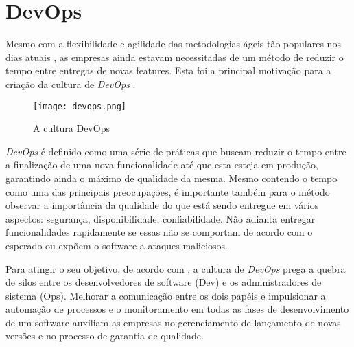 

\section{DevOps}

Mesmo com a flexibilidade e agilidade das metodologias ágeis tão populares nos dias atuais \cite{agileSoftwareDevelopment}, as empresas ainda estavam necessitadas de um método de reduzir o tempo entre entregas de novas features. Esta foi a principal motivação para a criação da cultura de \emph{DevOps} \cite{devopsBook}. 

\begin{figure}[ht]
\begin{center}
\texttt{[image: devops.png]}
\end{center}
\caption[A cultura DevOps]{
    A cultura DevOps
}\label{devops}
\end{figure}

\emph{DevOps} é definido como uma série de práticas que buscam reduzir o tempo entre a finalização de uma nova funcionalidade até que esta esteja em produção, garantindo ainda o máximo de qualidade da mesma. Mesmo contendo o tempo como uma das principais preocupações, é importante também para o método observar a importância da qualidade do que está sendo entregue em vários aspectos: segurança, disponibilidade, confiabilidade. Não adianta entregar funcionalidades rapidamente se essas não se comportam de acordo com o esperado ou expõem o software a ataques maliciosos.

Para atingir o seu objetivo, de acordo com \cite{devopsWiki}, a cultura de \emph{DevOps} prega a quebra de silos entre os desenvolvedores de software (Dev) e os administradores de sistema (Ops). Melhorar a comunicação entre os dois papéis e impulsionar a automação de processos e o monitoramento em todas as fases de desenvolvimento de um software auxiliam as empresas no gerenciamento de lançamento de novas versões e no processo de garantia de qualidade.

